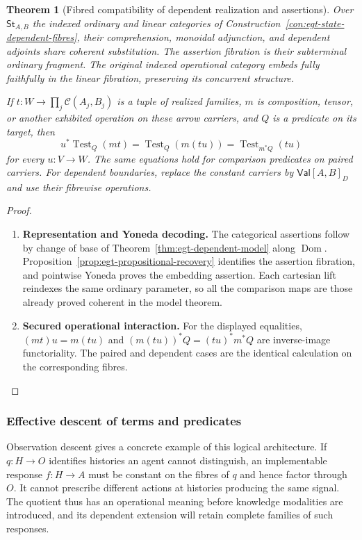 \documentclass[11pt,a4paper]{article}
\numberwithin{equation}{section}
\newtheorem{theorem}{Theorem}[section]
\theoremstyle{definition}
\theoremstyle{remark}
\theoremstyle{plain}
\begin{document}
\begin{theorem}[Fibred compatibility of dependent realization and assertions]
\label{thm:fib-linear-logical-compatibility}
Over $\mathsf{St}_{A,B}$ the indexed ordinary and linear categories of
Construction~\ref{con:egt-state-dependent-fibres}, their comprehension,
monoidal adjunction, and dependent adjoints share coherent substitution.
The assertion fibration is their subterminal ordinary fragment. The
original indexed operational category embeds fully faithfully in the
linear fibration, preserving its concurrent structure.

If $t:W\to\prod_j\mathcal C(A_j,B_j)$ is a tuple of realized families,
$m$ is composition, tensor, or another exhibited operation on these
arrow carriers, and $Q$ is a predicate on its target, then
\[
 u^*\operatorname{Test}_Q(mt)
 =\operatorname{Test}_Q(m(tu))
 =\operatorname{Test}_{m^*Q}(tu)
\]
for every $u:V\to W$. The same equations hold for comparison predicates
on paired carriers. For dependent boundaries, replace the constant
carriers by $\mathsf{Val}[A,B]_D$ and use their fibrewise operations.
\end{theorem}
\begin{proof}
\leavevmode
\begin{enumerate}[label=\textup{(\arabic*)},leftmargin=*,itemsep=4pt,topsep=3pt]
  \item \textbf{Representation and Yoneda decoding.} The categorical assertions follow by change of base of
Theorem~\ref{thm:egt-dependent-model} along $\operatorname{Dom}$. Proposition~\ref{prop:egt-propositional-recovery} identifies the assertion
fibration, and pointwise Yoneda proves the embedding assertion. Each
cartesian lift reindexes the same ordinary parameter, so all the
comparison maps are those already proved coherent in the model theorem.
  \item \textbf{Secured operational interaction.} For the displayed equalities, $(mt)u=m(tu)$ and
$(m(tu))^*Q=(tu)^*m^*Q$ are inverse-image functoriality. The paired and
dependent cases are the identical calculation on the corresponding
fibres. 
\end{enumerate}
\end{proof}

\subsubsection{Effective descent of terms and predicates}

Observation descent gives a concrete example of this logical
architecture. If $q:H\to O$ identifies histories an agent cannot
distinguish, an implementable response $f:H\to A$ must be constant on
the fibres of $q$ and hence factor through $O$. It cannot prescribe different
actions at histories producing the same signal. The quotient thus has an
operational meaning before knowledge modalities are introduced, and its
dependent extension will retain complete families of such responses.
\end{document}
